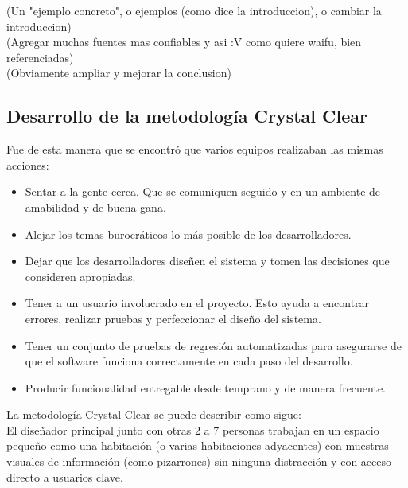 \documentclass[12pt,a4paper]{article}
\begin{document}
	(Un "ejemplo concreto", o ejemplos (como dice la introduccion), o cambiar la introduccion)\\
	
	(Agregar muchas fuentes mas confiables y asi :V como quiere waifu, bien referenciadas)\\
	
	(Obviamente ampliar y mejorar la conclusion)\\

	\subsection*{Desarrollo de la metodolog\'ia Crystal Clear}
		
	Fue de esta manera que se encontr\'o que varios equipos realizaban las mismas acciones:	
	\begin{itemize}
	\item Sentar a la gente cerca. Que se comuniquen seguido y en un ambiente de amabilidad y de buena gana.
	
	\item Alejar los temas burocr\'aticos lo m\'as posible de los desarrolladores.
	
 	\item Dejar que los desarrolladores dise\~nen el sistema y tomen las decisiones que consideren apropiadas.
	
	\item Tener a un usuario involucrado en el proyecto. Esto ayuda a encontrar errores, realizar pruebas y perfeccionar el dise\~no del sistema.
	
	\item Tener un conjunto de pruebas de regresi\'on automatizadas para asegurarse de que el software funciona correctamente en cada paso del desarrollo.
	
	\item Producir funcionalidad entregable desde temprano y de manera frecuente.
	\\
	\end{itemize}
					
	La metodolog\'ia Crystal Clear se puede describir como sigue:\\
	
	El dise\~nador principal junto con otras 2 a 7 personas trabajan en un espacio peque\~no como una habitaci\'on (o varias habitaciones adyacentes) con muestras visuales de informaci\'on (como pizarrones) sin ninguna distracci\'on y con acceso directo a usuarios clave.\\
	
\end{document}
